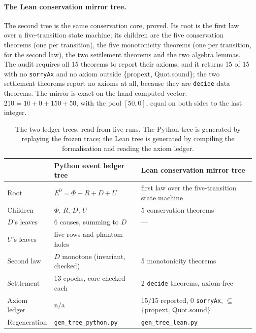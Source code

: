 \documentclass[11pt,a4paper]{article}
\newcommand{\Ezero}{E^{0}}
\begin{document}
\paragraph{The Lean conservation mirror tree.}
The second tree is the same conservation core, proved. Its root is the first law over a five-transition state machine; its children are the five conservation theorems (one per transition), the five monotonicity theorems (one per transition, for the second law), the two settlement theorems and the two algebra lemmas. The audit requires all 15 theorems to report their axioms, and it returns 15 of 15 with no \texttt{sorryAx} and no axiom outside \{propext, Quot.sound\}; the two settlement theorems report no axioms at all, because they are \texttt{decide} data theorems. The mirror is exact on the hand-computed vector: $210 = 10 + 0 + 150 + 50$, with the pool $[50, 0]$, equal on both sides to the last integer.

\begin{table}[t]
\centering
\caption{The two ledger trees, read from live runs. The Python tree is generated by replaying the frozen trace; the Lean tree is generated by compiling the formalisation and reading the axiom ledger.}
\label{tab:trees}
\begin{tabular}{lll}
\toprule
 & Python event ledger tree & Lean conservation mirror tree \\
\midrule
Root & $\Ezero = \Phi + R + D + U$ & first law over the five-transition state machine \\
Children & $\Phi$, $R$, $D$, $U$ & 5 conservation theorems \\
$D$'s leaves & 6 causes, summing to $D$ & --- \\
$U$'s leaves & live rows and phantom holes & --- \\
Second law & $D$ monotone (invariant, checked) & 5 monotonicity theorems \\
Settlement & 13 epochs, core checked each & 2 \texttt{decide} theorems, axiom-free \\
Axiom ledger & n/a & 15/15 reported, 0 \texttt{sorryAx}, $\subseteq$ \{propext, Quot.sound\} \\
Regeneration & \texttt{gen\_tree\_python.py} & \texttt{gen\_tree\_lean.py} \\
\bottomrule
\end{tabular}
\end{table}
\end{document}
